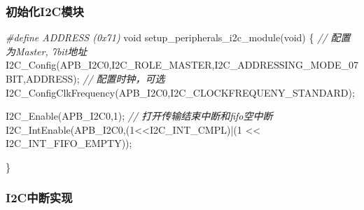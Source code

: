 \documentclass[
  12pt,
]{book}
\newenvironment{Shaded}{\begin{snugshade}}{\end{snugshade}}
\newcommand{\CommentTok}[1]{\textcolor[rgb]{0.56,0.35,0.01}{\textit{#1}}}
\newcommand{\DataTypeTok}[1]{\textcolor[rgb]{0.13,0.29,0.53}{#1}}
\newcommand{\DecValTok}[1]{\textcolor[rgb]{0.00,0.00,0.81}{#1}}
\newcommand{\NormalTok}[1]{#1}
\newcommand{\PreprocessorTok}[1]{\textcolor[rgb]{0.56,0.35,0.01}{\textit{#1}}}
\begin{document}
\hypertarget{ux521dux59cbux5316i2cux6a21ux5757-2}{%
\subsubsection{初始化I2C模块}\label{ux521dux59cbux5316i2cux6a21ux5757-2}}

\begin{Shaded}
\begin{Highlighting}[]
\PreprocessorTok{#define ADDRESS (0x71)}
\DataTypeTok{void}\NormalTok{ setup_peripherals_i2c_module(}\DataTypeTok{void}\NormalTok{)}
\NormalTok{\{}
  \CommentTok{// 配置为Master, 7bit地址}
\NormalTok{  I2C_Config(APB_I2C0,I2C_ROLE_MASTER,I2C_ADDRESSING_MODE_07BIT,ADDRESS);}
  \CommentTok{// 配置时钟，可选}
\NormalTok{  I2C_ConfigClkFrequency(APB_I2C0,I2C_CLOCKFREQUENY_STANDARD);}
  
\NormalTok{  I2C_Enable(APB_I2C0,}\DecValTok{1}\NormalTok{);}
  \CommentTok{// 打开传输结束中断和fifo空中断}
\NormalTok{  I2C_IntEnable(APB_I2C0,(}\DecValTok{1}\NormalTok{<<I2C_INT_CMPL)|(}\DecValTok{1}\NormalTok{ << I2C_INT_FIFO_EMPTY));}

\NormalTok{\}}
\end{Highlighting}
\end{Shaded}

\hypertarget{i2cux4e2dux65adux5b9eux73b0-1}{%
\subsubsection{I2C中断实现}\label{i2cux4e2dux65adux5b9eux73b0-1}}
\end{document}
